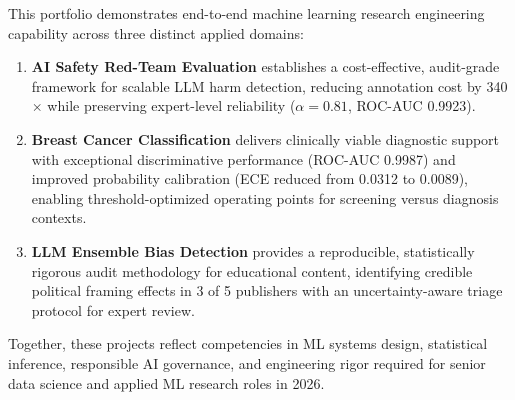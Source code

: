 \documentclass[11pt,a4paper]{article}
\begin{document}
This portfolio demonstrates end-to-end machine learning research engineering capability across three distinct applied domains:

\begin{enumerate}[leftmargin=*]
    \item \textbf{AI Safety Red-Team Evaluation} establishes a cost-effective, audit-grade framework for scalable LLM harm detection, reducing annotation cost by 340$\times$ while preserving expert-level reliability ($\alpha = 0.81$, ROC-AUC 0.9923).

    \item \textbf{Breast Cancer Classification} delivers clinically viable diagnostic support with exceptional discriminative performance (ROC-AUC 0.9987) and improved probability calibration (ECE reduced from 0.0312 to 0.0089), enabling threshold-optimized operating points for screening versus diagnosis contexts.

    \item \textbf{LLM Ensemble Bias Detection} provides a reproducible, statistically rigorous audit methodology for educational content, identifying credible political framing effects in 3 of 5 publishers with an uncertainty-aware triage protocol for expert review.
\end{enumerate}

Together, these projects reflect competencies in ML systems design, statistical inference, responsible AI governance, and engineering rigor required for senior data science and applied ML research roles in 2026.
\end{document}
